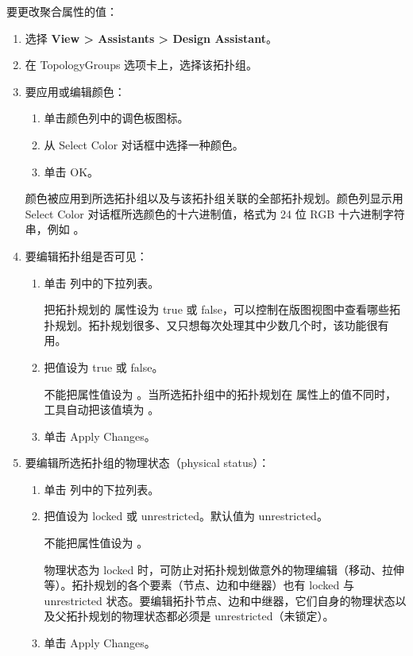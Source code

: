 要更改聚合属性的值：
\begin{enumerate}
  \item 选择 \textbf{View > Assistants > Design Assistant}。
  \item 在 TopologyGroups 选项卡上，选择该拓扑组。
  \item 要应用或编辑颜色：
  \begin{enumerate}[label=\alph*.]
    \item 单击颜色列中的调色板图标。
    \item 从 Select Color 对话框中选择一种颜色。
    \item 单击 OK。
  \end{enumerate}

  颜色被应用到所选拓扑组以及与该拓扑组关联的全部拓扑规划。颜色列显示用 Select Color 对话框所选颜色的十六进制值，格式为 24 位 RGB 十六进制字符串，例如 。
  \item 要编辑拓扑组是否可见：
  \begin{enumerate}[label=\alph*.]
    \item 单击  列中的下拉列表。

    把拓扑规划的  属性设为 true 或 false，可以控制在版图视图中查看哪些拓扑规划。拓扑规划很多、又只想每次处理其中少数几个时，该功能很有用。
    \item 把值设为 true 或 false。

    不能把属性值设为 。当所选拓扑组中的拓扑规划在  属性上的值不同时，工具自动把该值填为 。
    \item 单击 Apply Changes。
  \end{enumerate}
  \item 要编辑所选拓扑组的物理状态（physical status）：
  \begin{enumerate}[label=\alph*.]
    \item 单击  列中的下拉列表。
    \item 把值设为 locked 或 unrestricted。默认值为 unrestricted。

    不能把属性值设为 。

    物理状态为 locked 时，可防止对拓扑规划做意外的物理编辑（移动、拉伸等）。拓扑规划的各个要素（节点、边和中继器）也有 locked 与 unrestricted 状态。要编辑拓扑节点、边和中继器，它们自身的物理状态以及父拓扑规划的物理状态都必须是 unrestricted（未锁定）。
    \item 单击 Apply Changes。
  \end{enumerate}
\end{enumerate}

